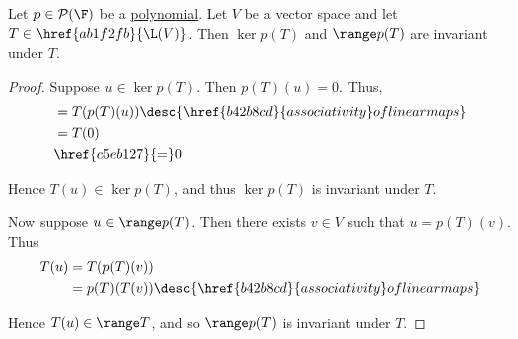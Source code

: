 \label{a22eafd}

Let $p\in\mathcal P(\F)$ be a \href{df84c07}{polynomial}. Let $V$ be a vector
space and let $T\in\href{ab1f2fb}{\L(V)}$. Then $\ker p(T)$ and $\range p(T)$
are invariant under $T$.

\begin{proof}
  Suppose $u\in\ker p(T)$. Then $p(T)(u)=0$. Thus,
  \begin{align*}
    [p(T)][T(u)] &=T(p(T)(u))\desc{\href{b42b8cd}{associativity} of linear maps} \\
                 &=T(0)                                                          \\
                 &\href{c5eb127}{=}0
  \end{align*}

  Hence $T(u)\in\ker p(T)$, and thus $\ker p(T)$ is invariant under $T$.

  Now suppose $u\in\range p(T)$. Then there exists $v\in V$ such that
  $u=p(T)(v)$. Thus
  \begin{align*}
    T(u) &=T(p(T)(v))                                                    \\
         &=p(T)(T(v))\desc{\href{b42b8cd}{associativity} of linear maps}
  \end{align*}

  Hence $T(u)\in\range T$, and so $\range p(T)$ is invariant under $T$.
\end{proof}
